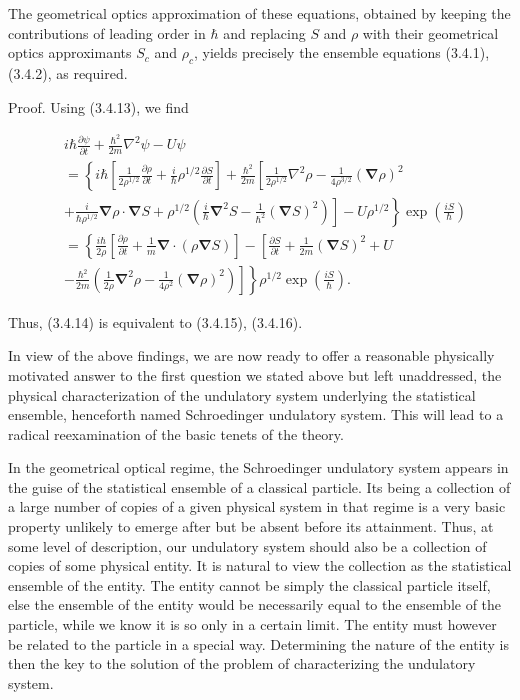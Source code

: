 \documentclass{article}
\begin{document}
The geometrical optics approximation of these equations, obtained by keeping the contributions of leading order in $\hbar$ and replacing $S$ and $\rho$ with their geometrical optics approximants $S_{c}$ and $\rho_{c}$, yields precisely the ensemble equations (3.4.1), (3.4.2), as required.

Proof. Using (3.4.13), we find
 
\begin{align*}
& i \hbar \frac{\partial \psi}{\partial t}+\frac{\hbar^{2}}{2 m} \nabla^{2} \psi-U \psi  \tag{3.4.17}\\
& =\left\{i \hbar\left[\frac{1}{2 \rho^{1 / 2}} \frac{\partial \rho}{\partial t}+\frac{i}{\hbar} \rho^{1 / 2} \frac{\partial S}{\partial t}\right]+\frac{\hbar^{2}}{2 m}\left[\frac{1}{2 \rho^{1 / 2}} \nabla^{2} \rho-\frac{1}{4 \rho^{3 / 2}}(\boldsymbol{\nabla} \rho)^{2}\right.\right. \\
& \left.\left.+\frac{i}{\hbar \rho^{1 / 2}} \boldsymbol{\nabla} \rho \cdot \boldsymbol{\nabla} S+\rho^{1 / 2}\left(\frac{i}{\hbar} \boldsymbol{\nabla}^{2} S-\frac{1}{\hbar^{2}}(\boldsymbol{\nabla} S)^{2}\right)\right]-U \rho^{1 / 2}\right\} \exp \left(\frac{i S}{\hbar}\right) \\
& =\left\{\frac{i \hbar}{2 \rho}\left[\frac{\partial \rho}{\partial t}+\frac{1}{m} \boldsymbol{\nabla} \cdot(\rho \boldsymbol{\nabla} S)\right]-\left[\frac{\partial S}{\partial t}+\frac{1}{2 m}(\boldsymbol{\nabla} S)^{2}+U\right.\right. \\
& \left.\left.-\frac{\hbar^{2}}{2 m}\left(\frac{1}{2 \rho} \boldsymbol{\nabla}^{2} \rho-\frac{1}{4 \rho^{2}}(\boldsymbol{\nabla} \rho)^{2}\right)\right]\right\} \rho^{1 / 2} \exp \left(\frac{i S}{\hbar}\right) .
\end{align*}
 

Thus, (3.4.14) is equivalent to (3.4.15), (3.4.16).

In view of the above findings, we are now ready to offer a reasonable physically motivated answer to the first question we stated above but left unaddressed, the physical characterization of the undulatory system underlying the statistical ensemble, henceforth named Schroedinger undulatory system. This will lead to a radical reexamination of the basic tenets of the theory.

In the geometrical optical regime, the Schroedinger undulatory system appears in the guise of the statistical ensemble of a classical particle. Its being a collection of a large number of copies of a given physical system in that regime is a very basic property unlikely to emerge after but be absent before its attainment. Thus, at some level of description, our undulatory system should also be a collection of copies of some physical entity. It is natural to view the collection as the statistical ensemble of the entity. The entity cannot be simply the classical particle itself, else the ensemble of the entity would be necessarily equal to the ensemble of the particle, while we know it is so only in a certain limit. The entity must however be related to the particle in a special way. Determining the nature of the entity is then the key to the solution of the problem of characterizing the undulatory system.
\end{document}

